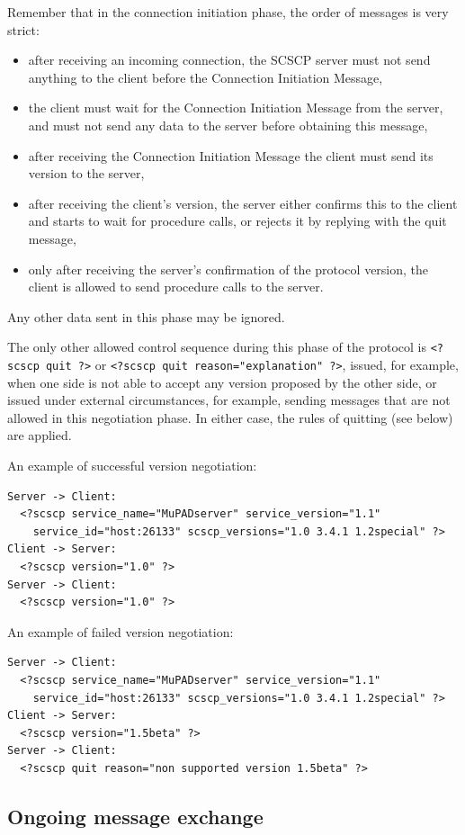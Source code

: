 \documentclass{amsart}
\begin{document}
Remember that in the connection initiation phase, the order of messages is very strict:
\begin{itemize}
\item after receiving an incoming connection, the SCSCP server must not 
send anything to the client before the Connection Initiation Message,
\item the client must wait for the Connection Initiation Message from the server, 
and must not send any data to the server before obtaining this message,
\item after receiving the Connection Initiation Message the client must send
its version to the server,
\item after receiving the client's version, the server either confirms this
to the client and starts to wait for procedure calls, or rejects it by replying
with the quit message,
\item only after receiving the server's confirmation of the protocol version, 
the client is allowed to send procedure calls to the server.
\end{itemize}
Any other data sent in this phase may be ignored.

The only other allowed control sequence during this phase of the protocol 
is {\tt <?scscp quit ?>} or \verb|<?scscp quit reason="explanation" ?>|, 
issued, for example, when one side is not able to 
accept any version proposed by the other side, or issued under external 
circumstances, for example, sending messages that are not allowed in this
negotiation phase. In either case, the rules of quitting (see below) are applied.

An example of successful version negotiation:
\begin{verbatim}
Server -> Client:
  <?scscp service_name="MuPADserver" service_version="1.1" 
    service_id="host:26133" scscp_versions="1.0 3.4.1 1.2special" ?>
Client -> Server: 
  <?scscp version="1.0" ?>
Server -> Client: 
  <?scscp version="1.0" ?>
\end{verbatim}

An example of failed version negotiation:
\begin{verbatim}
Server -> Client:
  <?scscp service_name="MuPADserver" service_version="1.1" 
    service_id="host:26133" scscp_versions="1.0 3.4.1 1.2special" ?>
Client -> Server: 
  <?scscp version="1.5beta" ?>
Server -> Client: 
  <?scscp quit reason="non supported version 1.5beta" ?>
\end{verbatim}

\subsection{Ongoing message exchange}
\end{document}
